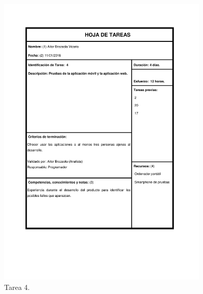 \documentclass{DeustoFDP}
\begin{document}
\begin{figure}[H]
    \centering
    \includegraphics[width=0.9\textwidth]{fig/Tareas/4}
    \caption{Tarea 4.}
    \label{fig:t4}
\end{figure}

\printbibliography[heading=bibintoc]

\appendix

\backmatter
\end{document}
